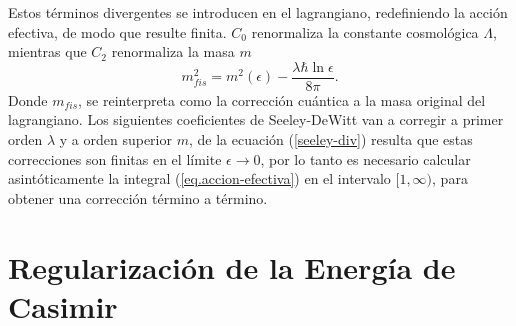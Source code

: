 Estos términos divergentes se introducen en el lagrangiano, redefiniendo la acción efectiva, de modo que resulte finita. $C_0$ renormaliza la constante cosmológica $\Lambda$, mientras que  $C_2$ renormaliza la masa $m$
\begin{equation}
m ^2 _{fis} = m ^2 ( \epsilon )  - \frac{\lambda \hbar \ln \epsilon}{8 \pi} .
\end{equation}
Donde $m _{fis}$, se reinterpreta como la corrección cuántica a la masa original del lagrangiano. Los siguientes coeficientes de  Seeley-DeWitt van a corregir a primer orden $\lambda$ y a orden superior $m$, de la ecuación (\ref{seeley-div}) resulta que estas correcciones son finitas en el límite $\epsilon \rightarrow 0$, por lo tanto es necesario calcular asintóticamente la integral (\ref{eq.accion-efectiva}) en el intervalo $[1, \infty)$, para obtener una corrección término a término.

\section{Regularización de la Energía de Casimir}\label{cap.casimir}

